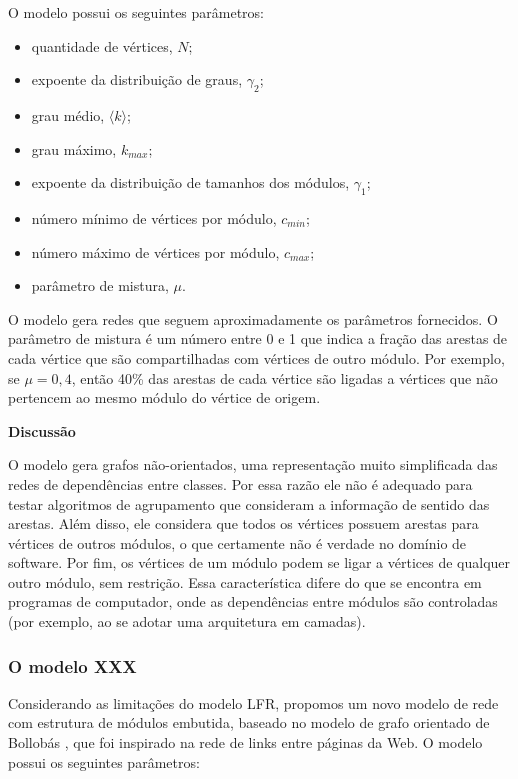 \documentclass{acm_proc_article-sp}
\begin{document}
O modelo possui os seguintes parâmetros:
\begin{itemize}
  \item quantidade de vértices, $N$;
  \item expoente da distribuição de graus, $\gamma_2$;
  \item grau médio, $\langle k \rangle$;
  \item grau máximo, $k_{max}$;
  \item expoente da distribuição de tamanhos dos módulos, $\gamma_1$;
  \item número mínimo de vértices por módulo, $c_{min}$;
  \item número máximo de vértices por módulo, $c_{max}$;
  \item parâmetro de mistura, $\mu$.
\end{itemize}

O modelo gera redes que seguem aproximadamente os parâmetros fornecidos. O parâmetro de mistura é um número entre 0 e 1 que indica a fração das arestas de cada vértice que são compartilhadas com vértices de outro módulo. Por exemplo, se $\mu = 0,4$, então 40\% das arestas de cada vértice são ligadas a vértices que não pertencem ao mesmo módulo do vértice de origem.

  \textbf{Discussão}

  O modelo gera grafos não-orientados, uma representação muito simplificada das redes de dependências entre classes. Por essa razão ele não é adequado para testar algoritmos de agrupamento que consideram a informação de sentido das arestas. Além disso, ele considera que todos os vértices possuem arestas para vértices de outros módulos, o que certamente não é verdade no domínio de software. Por fim, os vértices de um módulo podem se ligar a vértices de qualquer outro módulo, sem restrição. Essa característica difere do que se encontra em programas de computador, onde as dependências entre módulos são controladas (por exemplo, ao se adotar uma arquitetura em camadas).

\subsubsection{O modelo XXX}

Considerando as limitações do modelo LFR, propomos um novo modelo de rede com estrutura de módulos embutida, baseado no modelo de grafo orientado de Bollobás \cite{Bollobas2003}, que foi inspirado na rede de links entre páginas da Web. O modelo possui os seguintes parâmetros:
\end{document}
